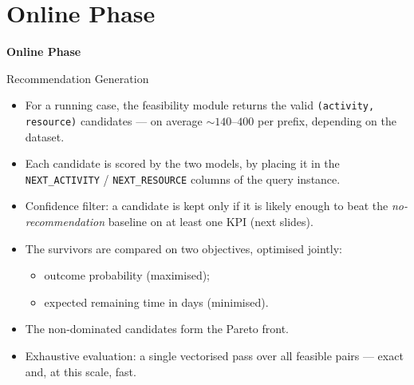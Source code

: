 \documentclass[aspectratio=169]{beamer} %
\begin{document}
\section{Online Phase}

\begin{frame}[plain,c]
    \centering
    \color{Darkcandyapplered}
    \Huge\textbf{Online Phase}
\end{frame}

\begin{frame}{Recommendation Generation}
  \small
  \begin{itemize}
    \item For a running case, the feasibility module returns the valid
      \texttt{(activity, resource)} candidates --- on average
      $\sim\!140\text{--}400$ per prefix, depending on the dataset.
    \item Each candidate is scored by the two models, by placing it in the
      \texttt{NEXT\_ACTIVITY} / \texttt{NEXT\_RESOURCE} columns of the query instance.
    \item \alert{Confidence filter:} a candidate is kept only if it is likely enough
      to beat the \emph{no-recommendation} baseline on at least one KPI (next slides).
    \item The survivors are compared on \alert{two objectives}, optimised jointly:
      \begin{itemize}
        \item outcome probability (maximised);
        \item expected remaining time in days (minimised).
      \end{itemize}
    \item The \alert{non-dominated} candidates form the Pareto front.
    \item Exhaustive evaluation: a single vectorised pass over all feasible pairs — exact and, at this scale, fast.
  \end{itemize}
\end{frame}
\end{document}
